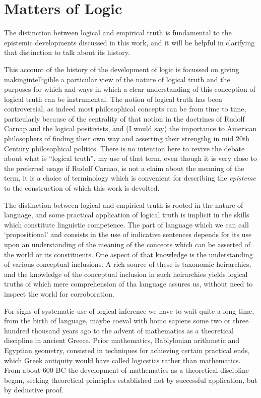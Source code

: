 \documentclass[10pt,titlepage]{article}
\begin{document}
\section{Matters of Logic}

The distinction between logical and empirical truth is fundamental to the epistemic developments discussed in this work, and it will be helpful in clarifying that distinction to talk about its history.


This account of the history of the development of logic is focussed on giving makingintelligible a particular view of the nature of logical truth and the purposes for which and ways in which a clear understanding of this conception of logical truth can be instrumental.
The notion of logical truth has been controversial, as indeed most philosophical concepts can be from time to time, particularly because of the centrality of that notion in the doctrines of Rudolf Carnap and the logical positivists, and (I would say) the importance to American philosophers of finding their own way and asserting their strengthg in mid 20th Century philosophical politics.
There is no intention here to revive the debate about what is ``logical truth'', my use of that term, even though it is very close to the preferred usage if Rudolf Carnao, is not a claim about the meaning of the term, it is a choice of terminology which is convenient for describing the \emph{episteme} to the construction of which this work is devolted.

The distinction between logical and empirical truth is rooted in the nature of language, and some practical application of logical truth is implicit in the skills which constitute linguistic competence.
The part of language which we can call `propositional' and consists in the use of indicative sentences depends for its use upon an understanding of the meaning of the conceots which can be asserted of the world or its constituents.
One aspect of that knowledge is the understanding of various conceptual inclusions.
A rich source of these is taxonomic heirarchies, and the knowledge of the conceptual inclusion in such heirarchies yields logical truths of which mere comprehension of tha language assures us, without need to inspect the world for corroboration.

For signs of systematic use of logical inference we have to wait quite a long time, from the birth of language, maybe coeval with homo sapiens some two or three hundred thousand years ago to the advent of mathematics as a theoretical discipline in ancient Greece.
Prior mathematics, Bablylonian arithmetic and Egyptian geometry, consisted in techniques for achieving certain practical ends, which Greek antiquity would have called logicstics rather than mathematics.
From about 600 BC the development of mathematics as a theoretical discipline began, seeking theoretical principles established not by successful application, but by deductive proof.
\end{document}
